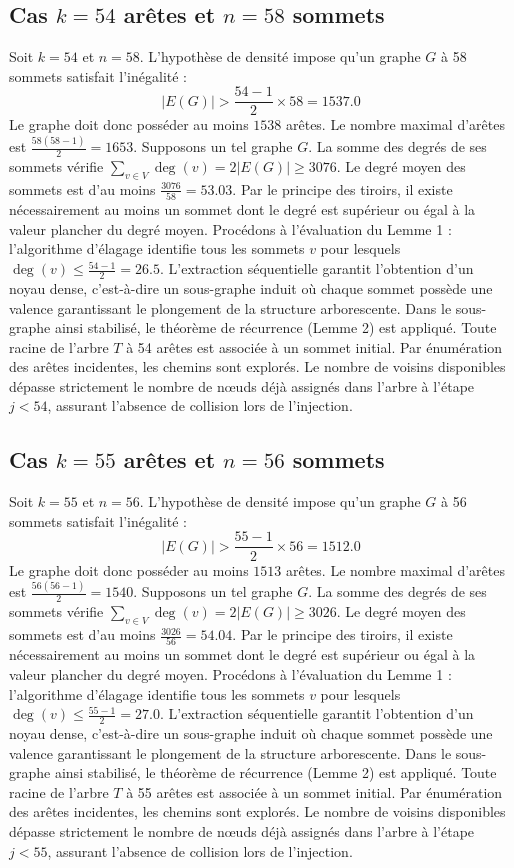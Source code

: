 \documentclass[12pt,a4paper]{article}
\begin{document}
\subsection{Cas $k = 54$ arêtes et $n = 58$ sommets}
Soit $k = 54$ et $n = 58$. L'hypothèse de densité impose qu'un graphe $G$ à 58 sommets satisfait l'inégalité :
$$ |E(G)| > \frac{54-1}{2} \times 58 = 1537.0 $$
Le graphe doit donc posséder au moins $1538$ arêtes. Le nombre maximal d'arêtes est $\frac{58(58-1)}{2} = 1653$.
Supposons un tel graphe $G$. La somme des degrés de ses sommets vérifie $\sum_{v \in V} \deg(v) = 2|E(G)| \geq 3076$.
Le degré moyen des sommets est d'au moins $\frac{3076}{58} = 53.03$.
Par le principe des tiroirs, il existe nécessairement au moins un sommet dont le degré est supérieur ou égal à la valeur plancher du degré moyen.
Procédons à l'évaluation du Lemme 1 : l'algorithme d'élagage identifie tous les sommets $v$ pour lesquels $\deg(v) \leq \frac{54-1}{2} = 26.5$.
L'extraction séquentielle garantit l'obtention d'un noyau dense, c'est-à-dire un sous-graphe induit où chaque sommet possède une valence garantissant le plongement de la structure arborescente.
Dans le sous-graphe ainsi stabilisé, le théorème de récurrence (Lemme 2) est appliqué. Toute racine de l'arbre $T$ à 54 arêtes est associée à un sommet initial. Par énumération des arêtes incidentes, les chemins sont explorés. Le nombre de voisins disponibles dépasse strictement le nombre de nœuds déjà assignés dans l'arbre à l'étape $j < 54$, assurant l'absence de collision lors de l'injection.

\subsection{Cas $k = 55$ arêtes et $n = 56$ sommets}
Soit $k = 55$ et $n = 56$. L'hypothèse de densité impose qu'un graphe $G$ à 56 sommets satisfait l'inégalité :
$$ |E(G)| > \frac{55-1}{2} \times 56 = 1512.0 $$
Le graphe doit donc posséder au moins $1513$ arêtes. Le nombre maximal d'arêtes est $\frac{56(56-1)}{2} = 1540$.
Supposons un tel graphe $G$. La somme des degrés de ses sommets vérifie $\sum_{v \in V} \deg(v) = 2|E(G)| \geq 3026$.
Le degré moyen des sommets est d'au moins $\frac{3026}{56} = 54.04$.
Par le principe des tiroirs, il existe nécessairement au moins un sommet dont le degré est supérieur ou égal à la valeur plancher du degré moyen.
Procédons à l'évaluation du Lemme 1 : l'algorithme d'élagage identifie tous les sommets $v$ pour lesquels $\deg(v) \leq \frac{55-1}{2} = 27.0$.
L'extraction séquentielle garantit l'obtention d'un noyau dense, c'est-à-dire un sous-graphe induit où chaque sommet possède une valence garantissant le plongement de la structure arborescente.
Dans le sous-graphe ainsi stabilisé, le théorème de récurrence (Lemme 2) est appliqué. Toute racine de l'arbre $T$ à 55 arêtes est associée à un sommet initial. Par énumération des arêtes incidentes, les chemins sont explorés. Le nombre de voisins disponibles dépasse strictement le nombre de nœuds déjà assignés dans l'arbre à l'étape $j < 55$, assurant l'absence de collision lors de l'injection.
\end{document}
